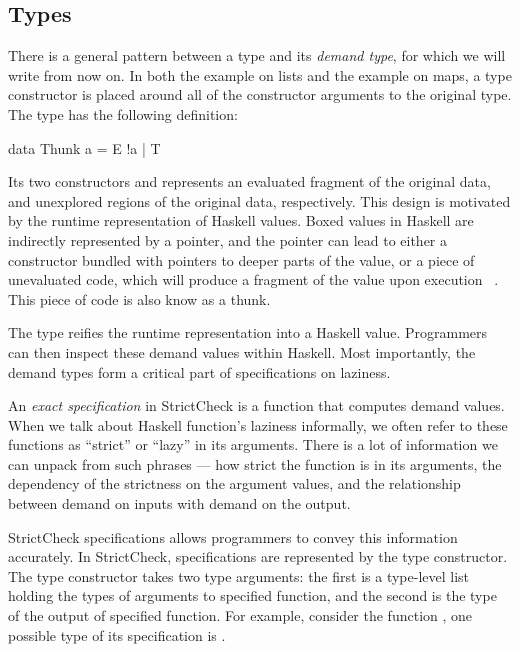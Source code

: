 \documentclass[acmsmall,review]{acmart}\settopmatter{}
\begin{document}
\subsection{Types}
There is a general pattern between a type  and
its \textit{demand type}, for which we will write  from
now on. In both the example on lists and the example on maps,
a  type constructor is placed around all of the constructor
arguments to the original type. The  type has the following
definition:
\begin{inlinecode}
data Thunk a = E !a | T
\end{inlinecode}
Its two constructors  and  represents an evaluated
fragment of the original data, and unexplored regions of the original
data, respectively.
%
This design is motivated by the runtime representation of Haskell
values. Boxed values in Haskell are indirectly represented by a
pointer, and the pointer can lead to either a constructor bundled with
pointers to deeper parts of the value, or a piece of unevaluated code,
which will produce a fragment of the value upon execution
~\cite{SPJSTG}. This piece of code is also know as a thunk.

The  type reifies  the runtime
representation into a Haskell value. Programmers can then inspect
these demand values within Haskell. Most importantly, the demand types
form a critical part of specifications on laziness.

An \textit{exact specification} in StrictCheck is a function that
computes demand values. When we talk about Haskell function's laziness
informally, we often refer to these functions as ``strict'' or
``lazy'' in its arguments. There is a lot of information we can unpack
from such phrases --- how strict the function is in its arguments, the
dependency of the strictness on the argument values, and the
relationship between demand on inputs with demand on the output.

StrictCheck specifications allows programmers to convey this
information accurately. In StrictCheck, specifications are represented
by the  type constructor. The  type constructor
takes two type arguments: the first is a type-level list holding the
types of arguments to specified function, and the second is the type
of the output of specified function. For example, consider the
function , one possible type of its
specification is .
\end{document}
